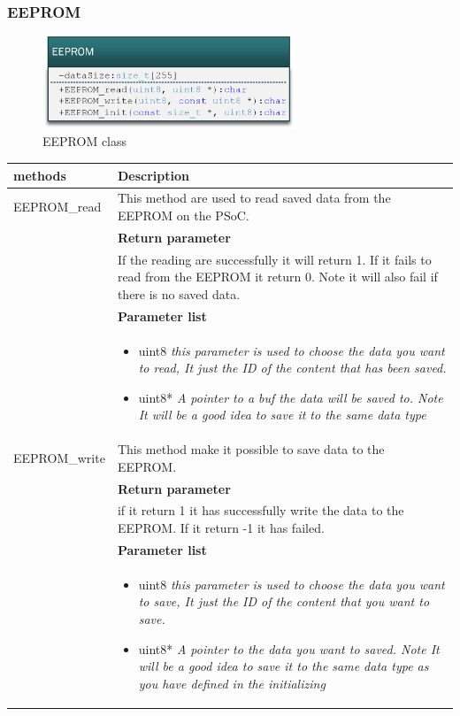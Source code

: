 \subsubsection{EEPROM}

\begin{figure}[H]
	\centering
	\includegraphics [width=3in]{../Documentation_RR/Software/Pictures/klassediagram_EEPROM.png}
	\caption{EEPROM class}
	\label{fig:Class_diagram_EEPROM}
\end{figure}


\begin{table}[H]
	\centering
	\begin{tabular}{|p{5 cm}|p{10 cm}|}
		\hline
		\textbf{methods} & \textbf{Description} \\ \hline
		
		EEPROM\_read
		& This method are used to read saved data from the EEPROM on the PSoC.
		\\ & \textbf{Return parameter}
		\\ & If the reading are successfully it will return 1. If it fails to read from the EEPROM it return 0. Note it will also fail if there is no saved data.
		\\ & \textbf{Parameter list}
		\\ & \begin{itemize}
			\item {\large uint8}
			\subitem \textit{this parameter is used to choose the data you want to read, It just the ID of the content that has been saved.}
			\item {\large uint8*}
			\subitem \textit{A pointer to a buf the data will be saved to. Note It will be a good idea to save it to the same data type}
		\end{itemize}
		\\ \hline
		
		EEPROM\_write
		& This method make it possible to save data to the EEPROM.
		\\ & \textbf{Return parameter}
		\\ & if it return 1 it has successfully write the data to the EEPROM. If it return -1 it has failed.
		\\ & \textbf{Parameter list}
		\\ & \begin{itemize}
			\item {\large uint8}
			\subitem \textit{this parameter is used to choose the data you want to save, It just the ID of the content that you want to save.}
			\item {\large uint8*}
			\subitem \textit{A pointer to the data you want to saved. Note It will be a good idea to save it to the same data type as you have defined in the initializing}
		\end{itemize}
		\\ \hline
		

\end{tabular}
\end{table}

